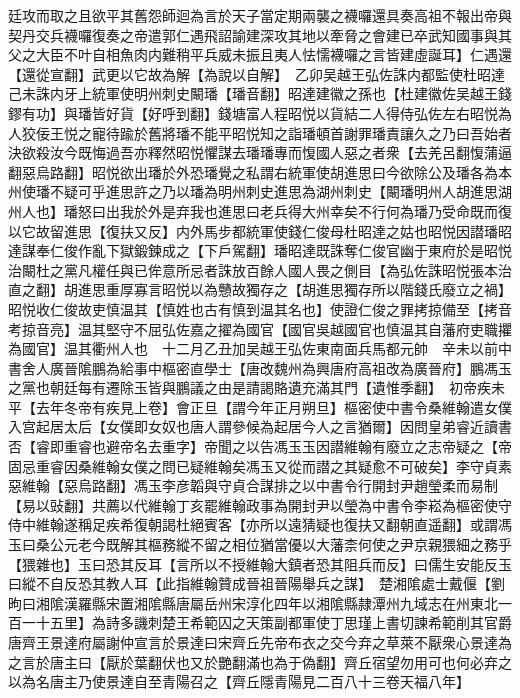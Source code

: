 廷攻而取之且欲平其舊怨師迴為言於天子當定期兩襲之襪囉還具奏高祖不報出帝與契丹交兵襪囉復奏之帝遣郭仁遇飛詔諭建深攻其地以牽脅之會建已卒武知國事與其父之大臣不叶自相魚肉内難稍平兵威未振且夷人怯懦襪囉之言皆建虛誕耳】仁遇還【還從宣翻】武更以它故為解【為說以自解】　乙卯吴越王弘佐誅内都監使杜昭達己未誅内牙上統軍使明州刺史闞璠【璠音翻】昭達建徽之孫也【杜建徽佐吴越王錢鏐有功】與璠皆好貨【好呼到翻】錢塘富人程昭悦以貨結二人得侍弘佐左右昭悦為人狡佞王悦之寵待踰於舊將璠不能平昭悦知之詣璠頓首謝罪璠責讓久之乃曰吾始者決欲殺汝今既悔過吾亦釋然昭悦懼謀去璠璠專而愎國人惡之者衆【去羌呂翻愎蒲逼翻惡烏路翻】昭悦欲出璠於外恐璠覺之私謂右統軍使胡進思曰今欲除公及璠各為本州使璠不疑可乎進思許之乃以璠為明州刺史進思為湖州刺史【闞璠明州人胡進思湖州人也】璠怒曰出我於外是弃我也進思曰老兵得大州幸矣不行何為璠乃受命既而復以它故留進思【復扶又反】内外馬步都統軍使錢仁俊母杜昭達之姑也昭悦因譛璠昭達謀奉仁俊作亂下獄鍛鍊成之【下戶駕翻】璠昭達既誅奪仁俊官幽于東府於是昭悦治闞杜之黨凡權任與已侔意所忌者誅放百餘人國人畏之側目【為弘佐誅昭悦張本治直之翻】胡進思重厚寡言昭悦以為戇故獨存之【胡進思獨存所以階錢氏廢立之禍】昭悦收仁俊故吏慎温其【慎姓也古有慎到温其名也】使證仁俊之罪拷掠備至【拷音考掠音亮】温其堅守不屈弘佐嘉之擢為國官【國官吳越國官也慎温其自藩府吏職㩴為國官】温其衢州人也　十二月乙丑加吴越王弘佐東南面兵馬都元帥　辛未以前中書舍人廣晉隂鵬為給事中樞密直學士【唐改魏州為興唐府高祖改為廣晉府】鵬馮玉之黨也朝廷每有遷除玉皆與鵬議之由是請謁賂遺充滿其門【遺惟季翻】　初帝疾未平【去年冬帝有疾見上卷】會正旦【謂今年正月朔旦】樞密使中書令桑維翰遣女僕入宫起居太后【女僕即女奴也唐人謂參候為起居今人之言猶爾】因問皇弟睿近讀書否【睿即重睿也避帝名去重字】帝聞之以告馮玉玉因譛維翰有廢立之志帝疑之【帝固忌重睿因桑維翰女僕之問已疑維翰矣馮玉又從而譛之其疑愈不可破矣】李守貞素惡維翰【惡烏路翻】馮玉李彦韜與守貞合謀排之以中書令行開封尹趙瑩柔而易制【易以䜴翻】共薦以代維翰丁亥罷維翰政事為開封尹以瑩為中書令李崧為樞密使守侍中維翰遂稱足疾希復朝謁杜絕賓客【亦所以遠猜疑也復扶又翻朝直遥翻】或謂馮玉曰桑公元老今既解其樞務縱不留之相位猶當優以大藩柰何使之尹京親猥細之務乎【猥雜也】玉曰恐其反耳【言所以不授維翰大鎮者恐其阻兵而反】曰儒生安能反玉曰縱不自反恐其教人耳【此指維翰贊成晉祖晉陽舉兵之謀】　楚湘隂處士戴偃【劉昫曰湘隂漢羅縣宋置湘隂縣唐屬岳州宋淳化四年以湘隂縣隷潭州九域志在州東北一百一十五里】為詩多譏刺楚王希範囚之天策副都軍使丁思瑾上書切諫希範削其官爵　唐齊王景達府屬謝仲宣言於景達曰宋齊丘先帝布衣之交今弃之草萊不厭衆心景達為之言於唐主曰【厭於葉翻伏也又於艷翻滿也為于偽翻】齊丘宿望勿用可也何必弃之以為名唐主乃使景達自至青陽召之【齊丘隱青陽見二百八十三卷天福八年】

